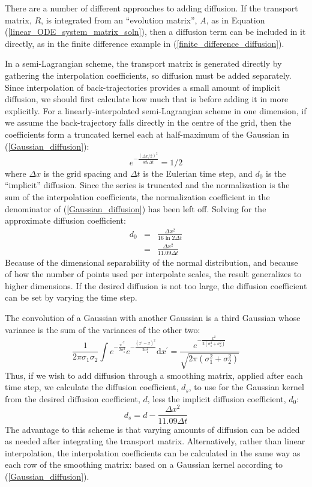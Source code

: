 \documentclass[11pt]{article}
\begin{document}
There are a number of different approaches to adding diffusion.
If the transport matrix, $R$, is integrated from an ``evolution matrix'',
$A$, as in Equation (\ref{linear_ODE_system_matrix_soln}), then a diffusion
term can be included in it directly, 
as in the finite difference example in (\ref{finite_difference_diffusion}).

In a semi-Lagrangian scheme, the transport matrix is generated directly
by gathering the interpolation coefficients, so diffusion must be added
separately.
Since interpolation of back-trajectories provides a small amount of implicit
diffusion, we should first calculate how much that is before adding it in
more explicitly.
For a linearly-interpolated semi-Lagrangian scheme in one dimension, 
if we assume the back-trajectory falls directly in
the centre of the grid, then the coefficients form a truncated kernel each
at half-maximum of the Gaussian in (\ref{Gaussian_diffusion}):
\begin{equation}
e^{-\frac{\left(\Delta x/2 \right)^2}{4d_0 \Delta t}} = 1/2
\end{equation}
where $\Delta x$ is the grid spacing and $\Delta t$ is the Eulerian time step,
and $d_0$ is the ``implicit'' diffusion.
Since the series is truncated and the normalization is the sum of the 
interpolation coefficients, the normalization coefficient in the denominator
of (\ref{Gaussian_diffusion}) has been left off. 
Solving for the approximate diffusion coefficient:
\begin{eqnarray}
	d_0 & = & \frac{\Delta x^2}{16 \ln 2 \Delta t} \\
	& = & \frac{\Delta x^2}{11.09 \Delta t}
\end{eqnarray}
Because of the dimensional separability of the normal distribution,
and because of how the number of points used per interpolate scales, 
the result generalizes to higher dimensions.
If the desired diffusion is not too large, the diffusion coefficient can
be set by varying the time step.

The convolution of a Gaussian with another Gaussian is a third Gaussian whose variance is the sum of the variances of the other two:
\begin{equation}
	\frac{1}{2 \pi \sigma_1 \sigma_2} \int e^{-\frac{{x^\prime}^2}{2 \sigma_1^2}} e ^{-\frac{(x^\prime - x)^2}{2 \sigma_2^2}} \mathrm d x^\prime
	= \frac{e^{-\frac{x^2}{2(\sigma_1^2 + \sigma_2^2)}}}{\sqrt{2 \pi (\sigma_1^2 + \sigma_2^2)}}
\end{equation}
Thus, if we wish to add diffusion through a smoothing matrix,
applied after each time step, we calculate the diffusion coefficient, $d_s$,
to use for the Gaussian kernel from the desired diffusion coefficient, $d$,
less the implicit diffusion coefficient, $d_0$:
\begin{equation}
	d_s = d - \frac{\Delta x^2}{11.09 \Delta t}
\end{equation}
The advantage to this scheme is that varying amounts of diffusion can be
added as needed after integrating the transport matrix.
Alternatively, rather than linear interpolation, the interpolation
coefficients can be calculated in the same way as each row of the smoothing
matrix: based on a Gaussian kernel according to (\ref{Gaussian_diffusion}).
\end{document}
